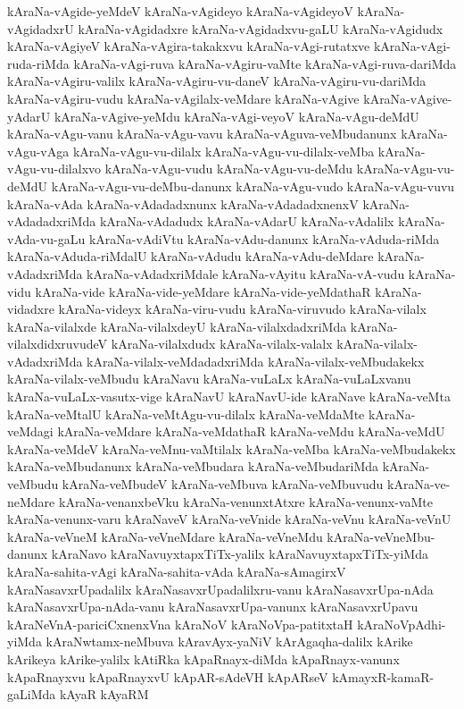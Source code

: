 {kAraNa-vAgide-yeMdeV
kAraNa-vAgideyo
kAraNa-vAgideyoV
kAraNa-vAgidadxrU
kAraNa-vAgidadxre
kAraNa-vAgidadxvu-gaLU
kAraNa-vAgidudx
kAraNa-vAgiyeV
kAraNa-vAgira-takakxvu
kAraNa-vAgi-rutatxve
kAraNa-vAgi-ruda-riMda
kAraNa-vAgi-ruva
kAraNa-vAgiru-vaMte
kAraNa-vAgi-ruva-dariMda
kAraNa-vAgiru-valilx
kAraNa-vAgiru-vu-daneV
kAraNa-vAgiru-vu-dariMda
kAraNa-vAgiru-vudu
kAraNa-vAgilalx-veMdare
kAraNa-vAgive
kAraNa-vAgive-yAdarU
kAraNa-vAgive-yeMdu
kAraNa-vAgi-veyoV
kAraNa-vAgu-deMdU
kAraNa-vAgu-vanu
kAraNa-vAgu-vavu
kAraNa-vAguva-veMbudanunx
kAraNa-vAgu-vAga
kAraNa-vAgu-vu-dilalx
kAraNa-vAgu-vu-dilalx-veMba
kAraNa-vAgu-vu-dilalxvo
kAraNa-vAgu-vudu
kAraNa-vAgu-vu-deMdu
kAraNa-vAgu-vu-deMdU
kAraNa-vAgu-vu-deMbu-danunx
kAraNa-vAgu-vudo
kAraNa-vAgu-vuvu
kAraNa-vAda
kAraNa-vAdadadxnunx
kAraNa-vAdadadxnenxV
kAraNa-vAdadadxriMda
kAraNa-vAdadudx
kAraNa-vAdarU
kAraNa-vAdalilx
kAraNa-vAda-vu-gaLu
kAraNa-vAdiVtu
kAraNa-vAdu-danunx
kAraNa-vAduda-riMda
kAraNa-vAduda-riMdalU
kAraNa-vAdudu
kAraNa-vAdu-deMdare
kAraNa-vAdadxriMda
kAraNa-vAdadxriMdale
kAraNa-vAyitu
kAraNa-vA-vudu
kAraNa-vidu
kAraNa-vide
kAraNa-vide-yeMdare
kAraNa-vide-yeMdathaR
kAraNa-vidadxre
kAraNa-videyx
kAraNa-viru-vudu
kAraNa-viruvudo
kAraNa-vilalx
kAraNa-vilalxde
kAraNa-vilalxdeyU
kAraNa-vilalxdadxriMda
kAraNa-vilalxdidxruvudeV
kAraNa-vilalxdudx
kAraNa-vilalx-valalx
kAraNa-vilalx-vAdadxriMda
kAraNa-vilalx-veMdadadxriMda
kAraNa-vilalx-veMbudakekx
kAraNa-vilalx-veMbudu
kAraNavu
kAraNa-vuLaLx
kAraNa-vuLaLxvanu
kAraNa-vuLaLx-vasutx-vige
kAraNavU
kAraNavU-ide
kAraNave
kAraNa-veMta
kAraNa-veMtalU
kAraNa-veMtAgu-vu-dilalx
kAraNa-veMdaMte
kAraNa-veMdagi
kAraNa-veMdare
kAraNa-veMdathaR
kAraNa-veMdu
kAraNa-veMdU
kAraNa-veMdeV
kAraNa-veMnu-vaMtilalx
kAraNa-veMba
kAraNa-veMbudakekx
kAraNa-veMbudanunx
kAraNa-veMbudara
kAraNa-veMbudariMda
kAraNa-veMbudu
kAraNa-veMbudeV
kAraNa-veMbuva
kAraNa-veMbuvudu
kAraNa-ve-neMdare
kAraNa-venanxbeVku
kAraNa-venunxtAtxre
kAraNa-venunx-vaMte
kAraNa-venunx-varu
kAraNaveV
kAraNa-veVnide
kAraNa-veVnu
kAraNa-veVnU
kAraNa-veVneM
kAraNa-veVneMdare
kAraNa-veVneMdu
kAraNa-veVneMbu-danunx
kAraNavo
kAraNavuyxtapxTiTx-yalilx
kAraNavuyxtapxTiTx-yiMda
kAraNa-sahita-vAgi
kAraNa-sahita-vAda
kAraNa-sAmagirxV
kAraNasavxrUpadalilx
kAraNasavxrUpadalilxru-vanu
kAraNasavxrUpa-nAda
kAraNasavxrUpa-nAda-vanu
kAraNasavxrUpa-vanunx
kAraNasavxrUpavu
kAraNeVnA-pariciCxnenxVna
kAraNoV
kAraNoVpa-patitxtaH
kAraNoVpAdhi-yiMda
kAraNwtamx-neMbuva
kAravAyx-yaNiV
kArAgaqha-dalilx
kArike
kArikeya
kArike-yalilx
kAtiRka
kApaRnayx-diMda
kApaRnayx-vanunx
kApaRnayxvu
kApaRnayxvU
kApAR-sAdeVH
kApARseV
kAmayxR-kamaR-gaLiMda
kAyaR
kAyaRM
}
